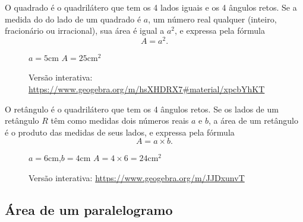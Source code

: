 O quadrado é o quadrilátero que tem os 4 lados iguais e os 4 ângulos retos. Se a medida do do lado de um quadrado é $a$, um número real qualquer (inteiro, fracionário ou irracional), sua área é igual a $a^2$, e expressa pela fórmula 
\begin{equation*}
A=a^2.
\end{equation*}

\begin{figure}[H]
\centering


$a=5$cm \hspace{2cm} $A=25$cm$^2$

\caption{Versão interativa: \url{https://www.geogebra.org/m/hsXHDRX7\#material/xpcbYhKT}}
\end{figure}

O retângulo é o quadrilátero que tem os 4 ângulos retos. Se os lados de um retângulo $R$ têm como medidas dois números reais $a$ e $b$, a área de um retângulo é o produto das medidas de seus lados, e expressa pela fórmula 
\begin{equation*}
A=a\times b.
\end{equation*}

\begin{figure}[H]
\centering


$a=6$cm,\quad $b=4$cm \hspace{2cm} $A=4\times6=24$cm$^2$

\caption{Versão interativa: \url{https://www.geogebra.org/m/JJDxunvT}}
\end{figure}

\clearpage

\subsection{Área de um paralelogramo}

